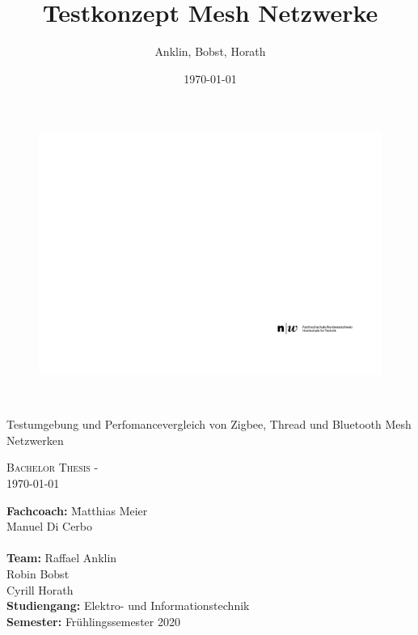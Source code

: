 \documentclass[final]{fhnwreport}       %
\title{Testkonzept Mesh Netzwerke}  		        %
\author{Anklin, Bobst, Horath}      				    %
\date{\today}          				   %
\begin{document}
\thispagestyle{empty}
	\begin{figure}
		 \vspace*{-\topskip}\vspace*{-\headsep}
		\includegraphics[scale=1]{graphics/fhnw_ht_logo_de.pdf}
	\end{figure}
	\begin{center}
		\vspace*{2cm}
		{\huge{\textbf{\thetitle}}}\\
		\vspace*{1cm}
		
		{\huge{Testumgebung und Perfomancevergleich von Zigbee, Thread und Bluetooth Mesh Netzwerken}}\\
		\vspace*{0.5cm}
		
		{\scshape\Large Bachelor Thesis - \theauthor \\} \Large{\today}
		\vfill
		
		
		\begin{normalsize}
			{\begin{tabbing}
						
					\textbf{Fachcoach:} \hspace{6cm}\= Matthias Meier\\
					\>Manuel Di Cerbo\\
					
					\\[0.4cm]
					
					\textbf{Team:} \>Raffael Anklin \\ \>Robin Bobst \\ \>Cyrill Horath
					\\[0.8cm]
					\textbf{Studiengang:} \>Elektro- und Informationstechnik
					\\[0.8cm]	\textbf{Semester:} \>Frühlingssemester 2020
			\end{tabbing}}
		\end{normalsize}
		\vfill
	\end{center}
\clearpage
\end{document}
